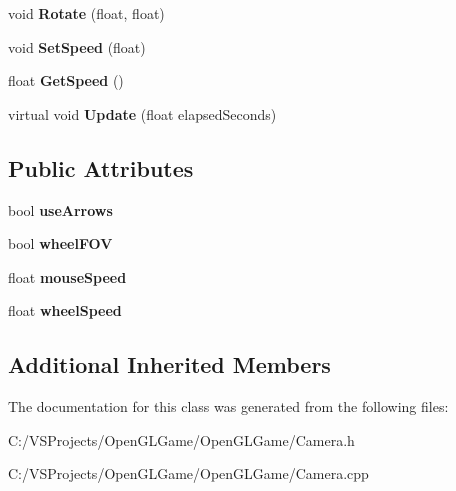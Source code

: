 \begin{DoxyCompactItemize}
\item 
\hypertarget{class_free_camera_ae4d88b80590eaba35b309ba0de072143}{void {\bfseries Rotate} (float, float)}\label{class_free_camera_ae4d88b80590eaba35b309ba0de072143}

\item 
\hypertarget{class_free_camera_a5a2d37c8d65f38af9e0b1577d434b622}{void {\bfseries Set\-Speed} (float)}\label{class_free_camera_a5a2d37c8d65f38af9e0b1577d434b622}

\item 
\hypertarget{class_free_camera_a6c8c17f15cae9b8b656d1b1797b95a6e}{float {\bfseries Get\-Speed} ()}\label{class_free_camera_a6c8c17f15cae9b8b656d1b1797b95a6e}

\item 
\hypertarget{class_free_camera_abe0c7159f42c168a6e866a2ac197eb5b}{virtual void {\bfseries Update} (float elapsed\-Seconds)}\label{class_free_camera_abe0c7159f42c168a6e866a2ac197eb5b}

\end{DoxyCompactItemize}
\subsection*{Public Attributes}
\begin{DoxyCompactItemize}
\item 
\hypertarget{class_free_camera_ada037bd10797cc58b984a50bef04a153}{bool {\bfseries use\-Arrows}}\label{class_free_camera_ada037bd10797cc58b984a50bef04a153}

\item 
\hypertarget{class_free_camera_ae753b9e085e3105864c0f199c67009bb}{bool {\bfseries wheel\-F\-O\-V}}\label{class_free_camera_ae753b9e085e3105864c0f199c67009bb}

\item 
\hypertarget{class_free_camera_a10fbce780e54d5e1f8d4370d4f424008}{float {\bfseries mouse\-Speed}}\label{class_free_camera_a10fbce780e54d5e1f8d4370d4f424008}

\item 
\hypertarget{class_free_camera_ae630434a54cd5e83985856f9fca82262}{float {\bfseries wheel\-Speed}}\label{class_free_camera_ae630434a54cd5e83985856f9fca82262}

\end{DoxyCompactItemize}
\subsection*{Additional Inherited Members}


The documentation for this class was generated from the following files\-:\begin{DoxyCompactItemize}
\item 
C\-:/\-V\-S\-Projects/\-Open\-G\-L\-Game/\-Open\-G\-L\-Game/Camera.\-h\item 
C\-:/\-V\-S\-Projects/\-Open\-G\-L\-Game/\-Open\-G\-L\-Game/Camera.\-cpp\end{DoxyCompactItemize}
